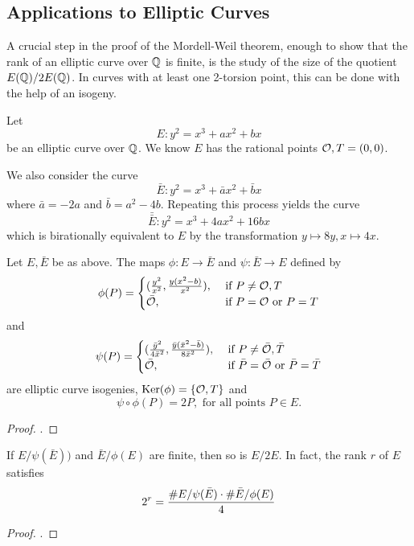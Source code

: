 \documentclass[12pt, a4paper]{amsart}
\begin{document}
\subsection{Applications to Elliptic Curves} \label{sec:applications}
A crucial step in the proof of the Mordell-Weil theorem, enough to show that
the rank of an elliptic curve over ${\mathbb Q}$ is finite, is the study of the size
of the quotient $E({\mathbb Q}) / 2 E({\mathbb Q})$. In curves with at least one 2-torsion
point, this can be done with the help of an isogeny.

Let $$E : y^2 = x^3 + ax^2 + bx$$ be an elliptic curve over ${\mathbb Q}$. We know $E$
has the rational points ${\mathcal O}, T = (0,0)$.

We also consider the curve
\[ \bar{E} : y^2 = x^3 + \bar{a}x^2 + \bar{b}x \]
where $\bar{a} = -2a$ and $\bar{b} = a^2 - 4b$. Repeating this process yields
the curve
\[ \bar{\bar{E}} : y^2 = x^3 +  4ax^2 + 16bx\]
which is birationally equivalent to $E$ by the transformation $y \mapsto 8y,
x \mapsto 4x$.

\begin{prop}
  Let $E, \bar{E}$ be as above. The maps $\phi : E \rightarrow \bar{E}$ and
  $\psi : \bar{E} \rightarrow E$ defined by
  \[\phi(P) =
    \begin{cases}
      (\frac{y^2}{x^2}, \frac{y(x^2-b)}{x^2}), & \text{ if } P \neq {\mathcal O}, T \\
      \bar{{\mathcal O}}, & \text{ if } P = {\mathcal O} \text{ or } P = T
    \end{cases}\]
  and
  \[\psi(P) =
    \begin{cases}
      (\frac{\bar{y}^2}{4\bar{x}^2}, \frac{\bar{y}(\bar{x}^2-\bar{b})}{8\bar{x}^2}),
      & \text{ if } P \neq \bar{{\mathcal O}}, \bar{T} \\
      \bar{{\mathcal O}}, & \text{ if } \bar{P} = \bar{{\mathcal O}} \text{ or } \bar{P} = \bar{T}
    \end{cases}\]
  are elliptic curve isogenies, $\text{Ker}(\phi) = \{{\mathcal O}, T\}$ and
  \[ \psi \circ \phi (P) = 2P , \text{ for all points } P \in E.\]
\end{prop}
\begin{proof}
  \cite[See][Chapter 4, page 79]{rational}.
\end{proof}

\begin{lemma} \label{lemma:rankformula}
  If $E / \psi(\bar{E}))$ and $\bar{E} / \phi(E)$ are finite, then so is $E/2E$.
  In fact, the rank $r$ of $E$ satisfies
  \[2^r = \frac{\#E/\psi(\bar{E}) \cdot \#\bar{E}/\phi(E)}{4}\]
\end{lemma}
\begin{proof}
  \cite[See][Chapter 4, page 83]{rational}.
\end{proof}
\end{document}
